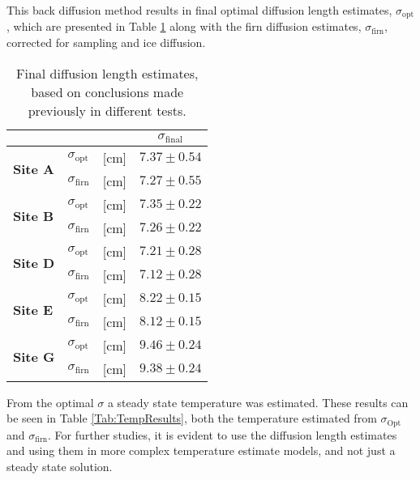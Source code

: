 \documentclass[../../CompleteThesis2/Complete_2ndDraft]{subfiles}
\begin{document}
This back diffusion method results in final optimal diffusion length estimates, $\sigma_{\text{opt}}$, which are presented in Table \ref{Tab:SigmaEstFinal2} along with the firn diffusion estimates, $\sigma_{\text{firn}}$, corrected for sampling and ice diffusion.
\begin{table}[ht]
	\centering
	\begin{tabular}{l l l | c }
		& & & $\sigma_{\text{final}}$\\[0.15cm]
		\hline
		\hline 
		\multirow{2}{*}{\textbf{Site A}} & $\sigma_{\text{opt}}$ & [cm] & $7.37 \pm 0.54$ \\[0.1cm]
		& $\sigma_{\text{firn}}$ & [cm] & $7.27\pm 0.55$ \\[0.1cm]
		\hline
		
		\multirow{2}{*}{\textbf{Site B}} & $\sigma_{\text{opt}}$ & [cm] & $7.35 \pm 0.22$ \\[0.1cm]
		& $\sigma_{\text{firn}}$ & [cm] & $7.26\pm 0.22$\\[0.1cm]
		\hline
		
		\multirow{2}{*}{\textbf{Site D}} & $\sigma_{\text{opt}}$ & [cm] & $7.21 \pm 0.28$ \\[0.1cm]
		& $\sigma_{\text{firn}}$ & [cm] & $7.12 \pm 0.28$\\[0.1cm]
		\hline
		
		\multirow{2}{*}{\textbf{Site E}} & $\sigma_{\text{opt}}$ & [cm] & $ 8.22\pm 0.15$ \\[0.1cm]
		& $\sigma_{\text{firn}}$ & [cm] & $8.12 \pm 0.15$\\[0.1cm]
		\hline
		
		\multirow{2}{*}{\textbf{Site G}} & $\sigma_{\text{opt}}$ & [cm] & $9.46 \pm 0.24$ \\[0.1cm]
		& $\sigma_{\text{firn}}$ & [cm] & $9.38 \pm 0.24$\\[0.1cm]
		
		\hline
	\end{tabular}
	\caption[Final $\sigma$ Estimates]{\small Final diffusion length estimates, based on conclusions made previously in different tests.}
	\label{Tab:SigmaEstFinal2}
\end{table}

From the optimal $\sigma$ a steady state temperature was estimated. These results can be seen in Table \ref{Tab:TempResults}, both the temperature estimated from $\sigma_{\text{Opt}}$ and $\sigma_{\text{firn}}$. For further studies, it is evident to use the diffusion length estimates and using them in more complex temperature estimate models, and not just a steady state solution.
\end{document}
